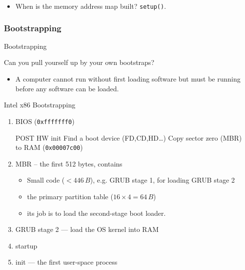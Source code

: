 \begin{itemize}
\item When is the memory address map built? \texttt{setup()}.
\end{itemize}

\subsubsection{Bootstrapping}
\label{sec:bootstrapping}

\begin{frame}{Bootstrapping}
  \begin{block}{Can you pull yourself up by your own bootstraps?}
    \begin{itemize}
    \item[] A computer cannot run without first loading software but must be running
      before any software can be loaded.
    \end{itemize}
  \end{block}
  \begin{center}
  \end{center}
\end{frame}

\begin{frame}{Intel x86 Bootstrapping}
  \begin{enumerate}
  \item BIOS (\texttt{0xfffffff0})\\
    \begin{small}
      {} POST\quad
      {} HW init\quad
      {} Find a boot device (FD,CD,HD\ldots{})\quad
      {} Copy \alert{sector zero (MBR)} to RAM (\texttt{0x00007c00})
    \end{small}
  \item MBR -- the first 512 bytes, contains
    \begin{itemize}
    \item Small code ($< 446\,B$), e.g. GRUB stage 1, for loading GRUB stage 2
    \item the primary partition table ($16\times{}4=64\,B$)
    \item its job is to load the second-stage boot loader.
    \end{itemize}
  \item GRUB stage 2 --- load the OS kernel into RAM
  \item {\linux} startup
  \item init --- the first user-space process
  \end{enumerate}
  \begin{center}
  \end{center}
  \qquad{}
\end{frame}


